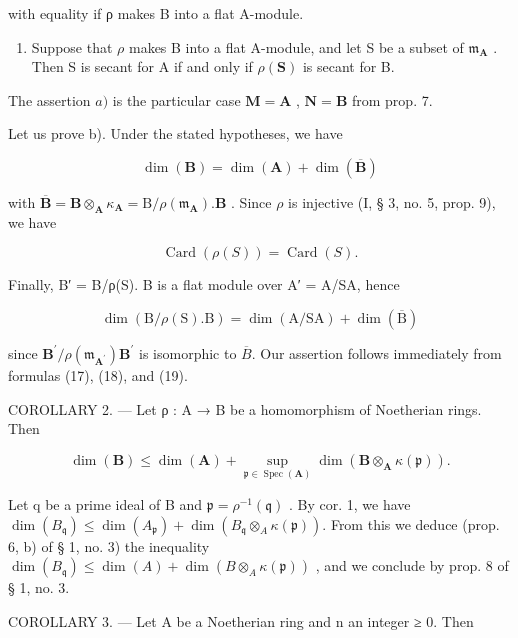 with equality if ρ makes B into a flat A-module.

\begin{enumerate}
\def\labelenumi{\alph{enumi})}
\setcounter{enumi}{1}
\tightlist
\item
  Suppose that \(\rho\) makes B into a flat A-module, and let S be a subset of \(\mathfrak{m}_{\mathbf{A}}\) . Then S is secant for A if and only if \(\rho(\mathbf{S})\) is secant for B.
\end{enumerate}

The assertion \(a)\) is the particular case \(\mathbf{M} = \mathbf{A}\) , \(\mathbf{N} = \mathbf{B}\) from prop. 7.

Let us prove b). Under the stated hypotheses, we have

\[
\dim (\mathbf {B}) = \dim (\mathbf {A}) + \dim (\overline {{\mathbf {B}}})\tag{17}
\]

with \(\overline{\mathbf{B}} = \mathbf{B} \otimes_{\mathbf{A}} \kappa_{\mathbf{A}} = \mathrm{B} / \rho(\mathfrak{m}_{\mathbf{A}}) . \mathbf{B}\) . Since \(\rho\) is injective (I, § 3, no. 5, prop. 9), we have

\[
\operatorname{Card} (\rho (S)) = \operatorname{Card} (S).\tag{18}
\]

Finally, B′ = B/ρ(S). B is a flat module over A′ = A/SA, hence

\[
\dim (\mathrm{B} / \rho (\mathrm{S}). \mathrm{B}) = \dim (\mathrm{A} / \mathrm{SA}) + \dim (\overline {{\mathrm{B}}})\tag{19}
\]

since \(\mathbf{B}^{\prime}/\rho(\mathfrak{m}_{\mathbf{A}^{\prime}})\mathbf{B}^{\prime}\) is isomorphic to \(\overline{B}\). Our assertion follows immediately from formulas (17), (18), and (19).

COROLLARY 2. — Let ρ : A → B be a homomorphism of Noetherian rings. Then

\[
\dim (\mathbf {B}) \leqslant \dim (\mathbf {A}) + \sup _ {\mathfrak {p} \in \operatorname{Spec} (\mathbf {A})} \dim (\mathbf {B} \otimes_ {\mathbf {A}} \kappa (\mathfrak {p})).
\]

Let q be a prime ideal of B and \(\mathfrak{p} = \rho^{-1}(\mathfrak{q})\) . By cor. 1, we have \(\dim(B_{\mathfrak{q}}) \leqslant \dim(A_{\mathfrak{p}}) + \dim(B_{\mathfrak{q}} \otimes_{A} \kappa(\mathfrak{p}))\). From this we deduce (prop. 6, b) of § 1, no. 3) the inequality \(\dim(B_{\mathfrak{q}}) \leqslant \dim(A) + \dim(B \otimes_{A} \kappa(\mathfrak{p}))\) , and we conclude by prop. 8 of § 1, no. 3.

COROLLARY 3. --- Let A be a Noetherian ring and n an integer ≥ 0. Then

